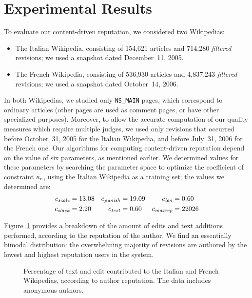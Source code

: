 \section{Experimental Results}

To evaluate our content-driven reputation, we considered two Wikipedias: 
%
\begin{itemize}

\item The Italian Wikipedia, consisting of 154,621 articles and 714,280
  {\em filtered\/} revisions; we used a snapshot dated December~11, 2005. 
\item The French Wikipedia, consisting of 536,930 articles and
  4,837,243 {\em filtered\/} revisions; we used a snapshot dated
  October~14, 2006. 

\end{itemize}
%
In both Wikipedias, we studied only \texttt{NS\_MAIN} pages, which
correspond to ordinary articles (other pages are used as comment
pages, or have other specialized purposes). 
Moreover, to allow the accurate computation of our quality
measures which require multiple judges,
we used only revisions that occurred before October~31, 2005 for
the Italian Wikipedia, and before July~31, 2006 for the French one. 
Our algorithms for computing content-driven reputation depend on the
value of six parameters, as mentioned earlier. 
We determined values for these parameters by searching the parameter
space to optimize the coefficient of constraint $\kappa_e$, using the Italian
Wikipedia as a training set; the values we determined are: 
%
\begin{align*}
   {c_{{\text{\textit{scale}}}}}      & = 13.08
  & {c_{{\text{\textit{punish}}}}}   & = 19.09
  & {c_{{\text{\textit{len}}}}}     & = 0.60   \\
   {c_{{\text{\textit{slack}}}}}         & = 2.20
  & {c_{{\text{\textit{text}}}}}     & = 0.60
  & {c_{{\text{\textit{maxrep}}}}}   & = 22026
\end{align*}

Figure~\ref{fig:user-breakdown-by-rep} provides a breakdown of
the amount of edits and text additions performed, according to the
reputation of the author.
We find an essentially bimodal distribution:
the overwhelming majority of revisions are authored by the
lowest and highest reputation users in the system.

\begin{figure}
\begin{center}

\end{center}
\caption{Percentage of text and edit contributed to the
  Italian and French Wikipedias, according to author reputation. 
  The data includes anonymous authors.}
\label{fig:user-breakdown-by-rep}
\end{figure}


